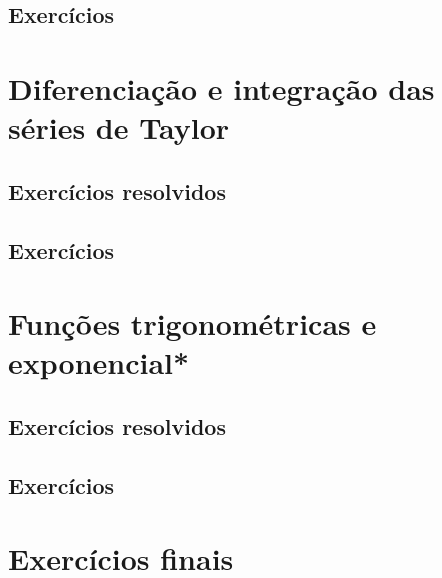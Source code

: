 \construirExeresol


\subsection*{Exercícios}

\construirExer


\section{Diferenciação e integração das séries de Taylor}
\construirSec

\subsection*{Exercícios resolvidos}

\construirExeresol


\subsection*{Exercícios}

\construirExer


\section{Funções trigonométricas e exponencial*}
\construirSec

\subsection*{Exercícios resolvidos}

\construirExeresol

\subsection*{Exercícios}

\construirExer

\section{Exercícios finais}

\construirExer



